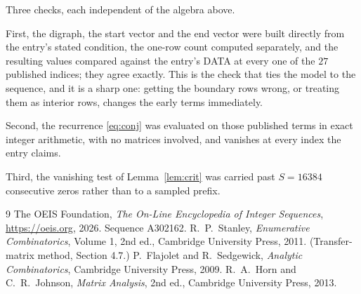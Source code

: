 \documentclass[11pt,a4paper]{article}
\theoremstyle{plain}
\theoremstyle{definition}
\begin{document}
Three checks, each independent of the algebra above.

First, the digraph, the start vector and the end vector were built directly from the
entry's stated condition, the one-row count computed separately, and the resulting values
compared against the entry's DATA at every one of the $27$ published indices; they
agree exactly. This is the check that ties the model to the sequence, and it is a sharp one:
getting the boundary rows wrong, or treating them as interior rows, changes the early terms
immediately.

Second, the recurrence \eqref{eq:conj} was evaluated on those published terms in exact
integer arithmetic, with no matrices involved, and vanishes at every index the entry claims.

Third, the vanishing test of Lemma~\ref{lem:crit} was carried past $S=16384$ consecutive
zeros rather than to a sampled prefix.

\begin{thebibliography}{9}
 The OEIS Foundation, \emph{The On-Line Encyclopedia of Integer
Sequences}, \url{https://oeis.org}, 2026. Sequence A302162.
 R.~P.~Stanley, \emph{Enumerative Combinatorics}, Volume 1, 2nd ed.,
Cambridge University Press, 2011. (Transfer-matrix method, Section 4.7.)
 P.~Flajolet and R.~Sedgewick, \emph{Analytic Combinatorics}, Cambridge
University Press, 2009.
 R.~A.~Horn and C.~R.~Johnson, \emph{Matrix Analysis}, 2nd ed., Cambridge
University Press, 2013.
\end{thebibliography}
\end{document}
